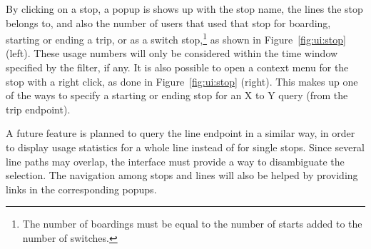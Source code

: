 	By clicking on a stop, a popup is shows up with the stop name, the lines the stop belongs to, and also the number of users that used that stop for boarding, starting or ending a trip, or as a switch stop,\footnote{The number of boardings must be equal to the number of starts added to the number of switches.} as shown in Figure~\ref{fig:ui:stop} (left). These usage numbers will only be considered within the time window specified by the filter, if any. It is also possible to open a context menu for the stop with a right click, as done in Figure~\ref{fig:ui:stop} (right). This makes up one of the ways to specify a starting or ending stop for an X to Y query (from the trip endpoint).
	
	A future feature is planned to query the line endpoint in a similar way, in order to display usage statistics for a whole line instead of for single stops. Since several line paths may overlap, the interface must provide a way to disambiguate the selection. The navigation among stops and lines will also be helped by providing links in the corresponding popups.
	
	
